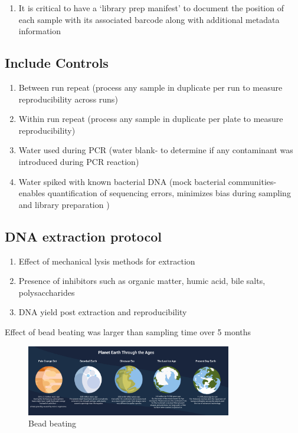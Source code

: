 \documentclass[
]{book}
\providecommand{\tightlist}{%
  \setlength{\itemsep}{0pt}\setlength{\parskip}{0pt}}
\begin{document}
\begin{enumerate}
\def\labelenumi{\arabic{enumi}.}
\setcounter{enumi}{1}
\tightlist
\item
  It is critical to have a `library prep manifest' to document the position of each sample with its associated barcode along with additional metadata information
\end{enumerate}

\hypertarget{include-controls}{%
\subsection{Include Controls}\label{include-controls}}

\begin{enumerate}
\def\labelenumi{\arabic{enumi}.}
\tightlist
\item
  Between run repeat (process any sample in duplicate per run to measure reproducibility across runs)
\item
  Within run repeat (process any sample in duplicate per plate to measure reproducibility)
\item
  Water used during PCR (water blank- to determine if any contaminant was introduced during PCR reaction)
\item
  Water spiked with known bacterial DNA (mock bacterial communities- enables quantification of sequencing errors, minimizes bias during sampling and library preparation )
\end{enumerate}

\hypertarget{dna-extraction-protocol}{%
\subsection{DNA extraction protocol}\label{dna-extraction-protocol}}

\begin{enumerate}
\def\labelenumi{\arabic{enumi}.}
\tightlist
\item
  Effect of mechanical lysis methods for extraction
\item
  Presence of inhibitors such as organic matter, humic acid, bile salts, polysaccharides
\item
  DNA yield post extraction and reproducibility
\end{enumerate}

Effect of bead beating was larger than sampling time over 5 months

\begin{figure}
\centering
\includegraphics[width=0.8\textwidth,height=\textheight]{./Figures/Planets.png}
\caption{Bead beating}
\end{figure}
\end{document}
